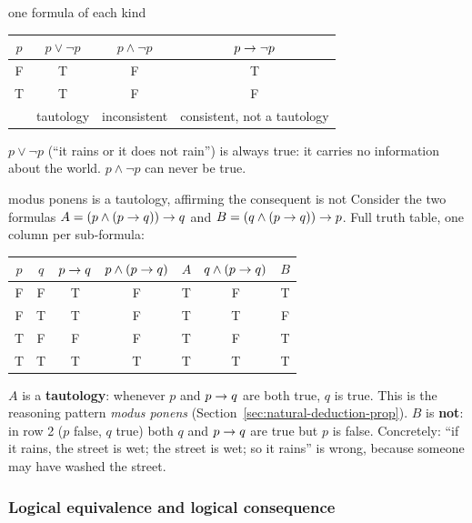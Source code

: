 \begin{nbexample}{one formula of each kind}
\begin{center}
\renewcommand{\arraystretch}{1.1}
\begin{tabular}{c|c|c|c}
$p$ & $p \lor \neg p$ & $p \land \neg p$ & $p \rightarrow \neg p$ \\
\hline
F & T & F & T \\
T & T & F & F \\
\hline
 & \textcolor{nbblue}{tautology} & \textcolor{nbred}{inconsistent} & \textcolor{nbgreen!70!black}{consistent, not a tautology}
\end{tabular}
\end{center}
$p \lor \neg p$ (``it rains or it does not rain'') is always true: it carries no
information about the world. $p \land \neg p$ can never be true.
\end{nbexample}

\begin{nbexample}{modus ponens is a tautology, affirming the consequent is not}
\notinslides
Consider the two formulas $A = (p \land (p \rightarrow q)) \rightarrow q$ and
$B = (q \land (p \rightarrow q)) \rightarrow p$. Full truth table, one column per sub-formula:
\begin{center}
\renewcommand{\arraystretch}{1.1}
\begin{tabular}{cc|c|cc|cc}
$p$ & $q$ & $p \rightarrow q$ & $p \land (p\rightarrow q)$ & $A$ & $q \land (p \rightarrow q)$ & $B$ \\
\hline
F & F & T & F & T & F & T \\
F & T & T & F & T & T & \cellcolor{nbred!20}F \\
T & F & F & F & T & F & T \\
T & T & T & T & T & T & T \\
\end{tabular}
\end{center}
$A$ is a \textbf{tautology}: whenever $p$ and $p \rightarrow q$ are both true, $q$ is true. This
is the reasoning pattern \emph{modus ponens} (Section~\ref{sec:natural-deduction-prop}).
$B$ is \textbf{not}: in row 2 ($p$ false, $q$ true) both $q$ and $p \rightarrow q$ are true but
$p$ is false. Concretely: ``if it rains, the street is wet; the street is wet; so it
rains'' is wrong, because someone may have washed the street.
\end{nbexample}

\subsubsection{Logical equivalence and logical consequence}
\notinslides


